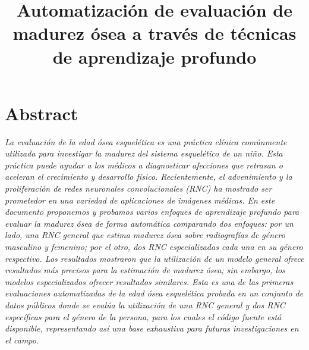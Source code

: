 \documentclass[conference]{IEEEtran}
\begin{document}
\title{Automatización de evaluación de madurez ósea a través de técnicas de aprendizaje profundo\\
}


\maketitle

%


\section*{Abstract}

\textit
{
La evaluación de la edad ósea esquelética es una práctica clínica comúnmente utilizada para investigar la madurez del sistema esquelético de un niño. Esta práctica puede ayudar a los médicos a diagnosticar afecciones que retrasan o aceleran el crecimiento y desarrollo físico. Recientemente, el advenimiento y la proliferación de redes neuronales convolucionales (RNC) ha mostrado ser prometedor en una variedad de aplicaciones de imágenes médicas. En este documento proponemos y probamos varios enfoques de aprendizaje profundo para evaluar la madurez ósea de forma automática comparando dos enfoques: por un lado, una RNC general que estima madurez ósea sobre radiografías de género masculino y femenino; por el otro, dos RNC especializadas cada una en su género respectivo. Los resultados mostraron que la utilización de un modelo general ofrece resultados más precisos para la estimación de madurez ósea; sin embargo, los modelos especializados ofrecer resultados similares. Esta es una de las primeras evaluaciones automatizadas de la edad ósea esquelética probada en un conjunto de datos públicos donde se evalúa la utilización de una RNC general y dos RNC específicas para el género de la persona, para los cuales el código fuente está disponible, representando así una base exhaustiva para futuras investigaciones en el campo.
}
\end{document}
